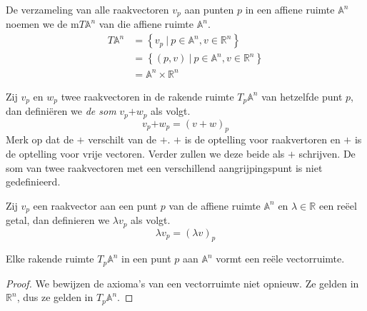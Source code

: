 \documentclass[main.tex]{subfiles}
\begin{document}
\begin{de}
  De verzameling van alle raakvectoren $v_{p}$ aan punten $p$ in een affiene ruimte $\mathbb{A}^{n}$ noemen we de  m$T\mathbb{A}^{n}$ van die affiene ruimte $\mathbb{A}^{n}$.
  \[
  \begin{array}{rl}
  T\mathbb{A}^{n} &= \left\{v_{p}\ |\ p \in \mathbb{A}^{n}, v \in \mathbb{R}^{n} \right\}\\
                 &= \left\{(p,v)\ |\ p \in\mathbb{A}^{n}, v \in \mathbb{R}^{n} \right\}\\
                 &= \mathbb{A}^{n} \times \mathbb{R}^{n}
  \end{array}
  \]
\end{de}

\begin{de}
  Zij $v_{p}$ en $w_{p}$ twee raakvectoren in de rakende ruimte $T_{p}\mathbb{A}^{n}$ van hetzelfde punt $p$, dan defini\"eren we \emph{de som} $v_{p}\boldsymbol{+}w_{p}$ als volgt.
  \[ v_{p} \boldsymbol{ + } w_{p} = (v + w)_{p}\]
  Merk op dat de $\boldsymbol{ + }$ verschilt van de $+$. $\boldsymbol{ + }$ is de optelling voor raakvertoren en $+$ is de optelling voor vrije vectoren. Verder zullen we deze beide als $+$ schrijven.
  De som van twee raakvectoren met een verschillend aangrijpingspunt is niet gedefinieerd.
\end{de}

\begin{de}
  Zij $v_{p}$ een raakvector aan een punt $p$ van de affiene ruimte $\mathbb{A}^{n}$ en $\lambda \in \mathbb{R}$ een re\"eel getal, dan definieren we  $\lambda v_{p}$ als volgt. 
  \[ \lambda v_{p} = (\lambda v)_{p}\]
\end{de}

\begin{st}
  \label{st:rakende-ruimte-is-vectorruimte}
  Elke rakende ruimte $T_{p}\mathbb{A}^{n}$ in een punt $p$ aan $\mathbb{A}^{n}$ vormt een re\"ele vectorruimte.
  \begin{proof}
    We bewijzen de axioma's van een vectorruimte niet opnieuw.
    Ze gelden in $\mathbb{R}^{n}$, dus ze gelden in $T_{p}\mathbb{A}^{n}$.
  \end{proof}
\end{st}
\end{document}
